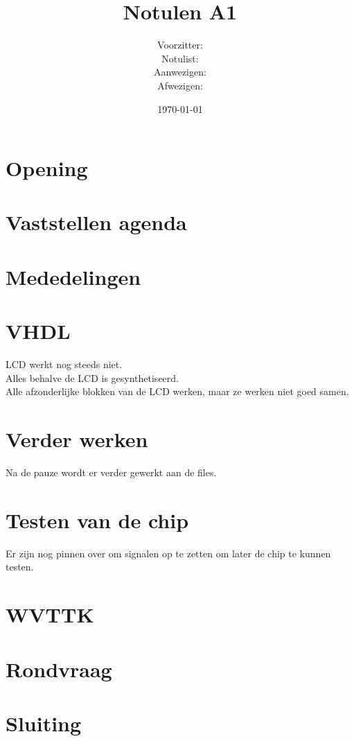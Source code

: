 \documentclass[11pt,twoside,a4paper]{article}
\title{Notulen A1}
\author{
Voorzitter:\\
Notulist:\\
Aanwezigen:\\
Afwezigen:\\
}
\date{\today}
\begin{document}
\maketitle

\section{Opening}

\section{Vaststellen agenda}

\section{Mededelingen}

\section{VHDL}
LCD werkt nog steeds niet.\\
Alles behalve de LCD is gesynthetiseerd.\\
Alle afzonderlijke blokken van de LCD werken, maar ze werken niet goed samen.

\section{Verder werken}
Na de pauze wordt er verder gewerkt aan de files.

\section{Testen van de chip}
Er zijn nog pinnen over om signalen op te zetten om later de chip te kunnen testen.

\section{WVTTK}

\section{Rondvraag}

\section{Sluiting}
\end{document}
